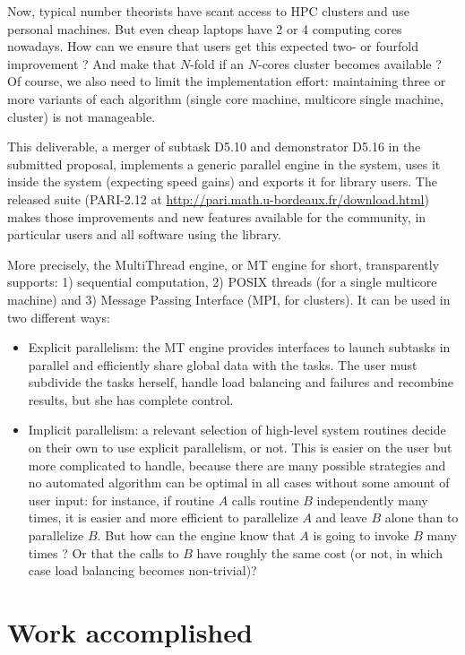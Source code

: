 \documentclass{deliverablereport}
\begin{document}
Now, typical number theorists have scant access to HPC clusters and use
personal machines. But even cheap laptops have 2 or 4 computing cores
nowadays. How can we ensure that \PariGP users get this expected two- or fourfold
improvement ? And make that $N$-fold if an $N$-cores cluster becomes
available ? Of course, we also need to limit the implementation effort:
maintaining three or more variants of each algorithm (single core machine,
multicore single machine, cluster) is not manageable.

This deliverable, a merger of subtask D5.10 and demonstrator D5.16 in the
submitted proposal, implements a generic parallel engine in the
\PariGP system, uses it inside the system (expecting speed gains) and
exports it for library users. The released \PariGP suite (PARI-2.12 at
\url{http://pari.math.u-bordeaux.fr/download.html}) makes those
improvements and new features available for the community, in particular
\Sage users and all software using the \Pari library.

More precisely, the MultiThread engine, or MT engine for short, transparently
supports: 1) sequential computation, 2) POSIX threads (for a single multicore
machine) and 3) Message Passing Interface (MPI, for clusters). It can be used
in two different ways:

\begin{itemize}
\item Explicit parallelism: the MT engine provides interfaces to launch
  subtasks in parallel and efficiently share global data with the tasks. The
  user must subdivide the tasks herself, handle load balancing and failures
  and recombine results, but she has complete control.

\item Implicit parallelism: a relevant selection of high-level system
  routines decide on their own to use explicit parallelism, or not. This is
  easier on the user but more complicated to handle, because there are many
  possible strategies and no automated algorithm can be optimal in all
  cases without some amount of user input: for instance, if routine $A$
  calls routine $B$ independently many times, it is easier and more efficient
  to parallelize $A$ and leave $B$ alone than to parallelize $B$. But how can
  the engine know that $A$ is going to invoke $B$ many times ? Or that the
  calls to $B$ have roughly the same cost (or not, in which case load
  balancing becomes non-trivial)?
\end{itemize}

\section{Work accomplished}
\end{document}
